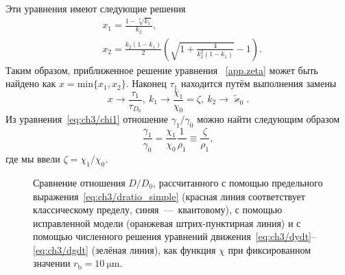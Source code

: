 Эти уравнения имеют следующие решения
\begin{align}
    &x_1 = \frac{1-\sqrt[3]{k_1}}{k_2}, \\
    &x_2 = \frac{k_2(1-k_1)}{2} \left( \sqrt{1 + \frac{4}{k_2^2 (1-k_1)}} - 1 \right).
\end{align}
Таким образом, приближенное решение уравнения ~\eqref{app.zeta} может быть найдено как $x = \text{min}\{x_1, x_2\}$.
Наконец $\tau_1$ находится путём выполнения замены
\begin{equation}
    x \rightarrow \frac{\tau_1}{\tau_{D_0}} ,\ 
    k_1 \rightarrow \frac{\chi_1}{\chi_0} = \zeta ,\ 
    k_2 \rightarrow \tilde{\varkappa}_0.
\end{equation}
Из уравнения~\eqref{eq:ch3/chi1} отношение $\gamma_1/\gamma_0$ можно найти следующим образом
\begin{equation}
    \frac{\gamma_1}{\gamma_0} = \frac{\chi_1}{\chi_0} \frac{1}{\rho_1} \equiv \frac{\zeta}{\rho_1},
\end{equation}
где мы ввели $\zeta=\chi_1/\chi_0$.

\begin{figure}
    \caption[Сравнение точности вычисления отношения $D/D_0$ в помощью различных методов]{\label{fig:ch3/scalings} 
    Сравнение отношения $D/D_0$, рассчитанного с помощью предельного выражения~\eqref{eq:ch3/dratio_simple} (красная линия соответствует классическому пределу, синяя~---~квантовому), с помощью исправленной модели (оранжевая штрих-пунктирная линия) и с помощью численного решения уравнений движения~\eqref{eq:ch3/dydt}--\eqref{eq:ch3/dgdt} (зелёная линия), как функция $\chi$ при фиксированном значении $r_\mathrm{b} = \SI{10}{\um}$.}
\end{figure}

